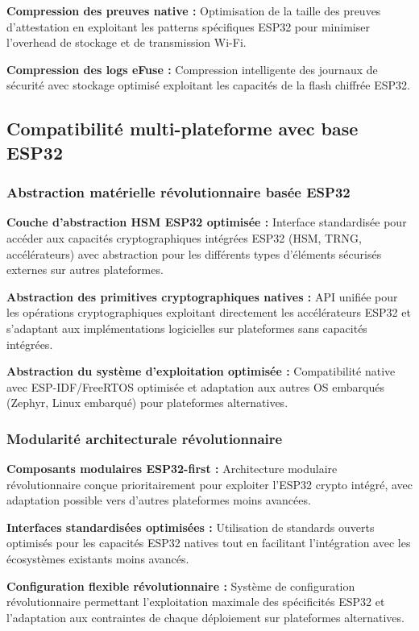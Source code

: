 \textbf{Compression des preuves native :} Optimisation de la taille des preuves d'attestation en exploitant les patterns spécifiques ESP32 pour minimiser l'overhead de stockage et de transmission Wi-Fi.

\textbf{Compression des logs eFuse :} Compression intelligente des journaux de sécurité avec stockage optimisé exploitant les capacités de la flash chiffrée ESP32.

\subsection{Compatibilité multi-plateforme avec base ESP32}

\subsubsection{Abstraction matérielle révolutionnaire basée ESP32}

\textbf{Couche d'abstraction HSM ESP32 optimisée :} Interface standardisée pour accéder aux capacités cryptographiques intégrées ESP32 (HSM, TRNG, accélérateurs) avec abstraction pour les différents types d'éléments sécurisés externes sur autres plateformes.

\textbf{Abstraction des primitives cryptographiques natives :} API unifiée pour les opérations cryptographiques exploitant directement les accélérateurs ESP32 et s'adaptant aux implémentations logicielles sur plateformes sans capacités intégrées.

\textbf{Abstraction du système d'exploitation optimisée :} Compatibilité native avec ESP-IDF/FreeRTOS optimisée et adaptation aux autres OS embarqués (Zephyr, Linux embarqué) pour plateformes alternatives.

\subsubsection{Modularité architecturale révolutionnaire}

\textbf{Composants modulaires ESP32-first :} Architecture modulaire révolutionnaire conçue prioritairement pour exploiter l'ESP32 crypto intégré, avec adaptation possible vers d'autres plateformes moins avancées.

\textbf{Interfaces standardisées optimisées :} Utilisation de standards ouverts optimisés pour les capacités ESP32 natives tout en facilitant l'intégration avec les écosystèmes existants moins avancés.

\textbf{Configuration flexible révolutionnaire :} Système de configuration révolutionnaire permettant l'exploitation maximale des spécificités ESP32 et l'adaptation aux contraintes de chaque déploiement sur plateformes alternatives.

